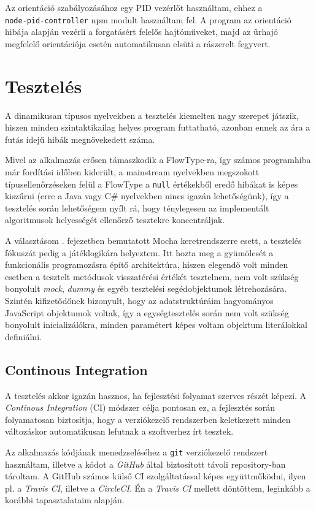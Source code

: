 Az orientáció szabályozásához egy PID vezérlőt használtam, ehhez a \\
\texttt{node-pid-controller} npm modult használtam fel. A program az orientáció
hibája alapján vezérli a forgatásért felelős hajtóműveket, majd az űrhajó
megfelelő orientációja esetén automatikusan elsüti a rászerelt fegyvert.

\section{Tesztelés}

A dinamikusan típusos nyelvekben a tesztelés kiemelten nagy szerepet játszik,
hiszen minden szintaktikailag helyes program futtatható, azonban ennek az ára a
futás idejű hibák megnövekedett száma.

Mivel az alkalmazás erősen támaszkodik a FlowType-ra, így számos programhiba már
fordítási időben kiderült, a mainstream nyelvekben megszokott
típusellenőrzéseken felül a FlowType a \texttt{null} értékekből eredő hibákat is
képes kiszűrni (erre a Java vagy C\# nyelvekben nincs igazán lehetőségünk), így
a tesztelés során lehetőségem nyílt rá, hogy ténylegesen az implementált
algoritmusok helyességét ellenőrző tesztekre koncentráljak.

A választásom . fejezetben bemutatott Mocha keretrendszerre
esett, a tesztelés fókuszát pedig a játéklogikára helyeztem. Itt hozta meg a
gyümölcsét a funkcionális programozásra építő architektúra, hiszen elegendő volt
minden esetben a tesztelt metódusok visszatérési értékét tesztelnem, nem volt
szükség bonyolult \emph{mock}, \emph{dummy} és egyéb tesztelési segédobjektumok
létrehozására. Szintén kifizetődőnek bizonyult, hogy az adatstruktúráim
hagyományos JavaScript objektumok voltak, így a egységtesztelés során nem volt
szükség bonyolult inicializálókra, minden paramétert képes voltam objektum
literálokkal definiálni.

\subsection{Continous Integration}\label{sec:ci}

A tesztelés akkor igazán hasznos, ha fejlesztési folyamat szerves részét képezi.
A \emph{Continous Integration} (CI) módszer célja pontosan ez, a fejlesztés során
folyamatosan biztosítja, hogy a verziókezelő rendszerben keletkezett minden
változáskor automatikusan lefutnak a szoftverhez írt tesztek.

Az alkalmazás kódjának menedzseléséhez a \texttt{git} verziókezelő
rendszert\cite{git} használtam, illetve a kódot a \emph{GitHub}\cite{github}
által biztosított távoli repository-ban tároltam. A GitHub számos külső CI
szolgáltatással képes együttműködni, ilyen pl. a \emph{Travis CI}\cite{travis},
illetve a \emph{CircleCI}\cite{circle}. Én a \emph{Travis CI} mellett döntöttem,
leginkább a korábbi tapasztalataim alapján.

